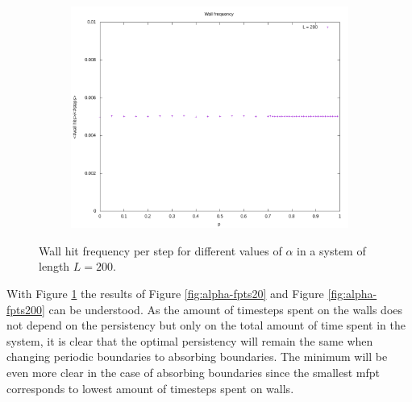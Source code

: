 \documentclass[]{scrartcl}
\begin{document}
\begin{figure}[!hbt]
\begin{subfigure}{0.45\textwidth}
\end{subfigure}
\begin{subfigure}{0.45\textwidth}
 \includegraphics[width=\textwidth]{./fig/alpha/wallFreq/WF-alpha=1-rel.png}
\end{subfigure}
\caption{Wall hit frequency per step for different values of $\alpha$ in a system of length $L = 200$.} 
\label{fig:alpha-wallFreq}
\end{figure}

With Figure \ref{fig:alpha-wallFreq} the results of Figure \ref{fig:alpha-fpts20} and Figure \ref{fig:alpha-fpts200} can be understood. As the amount of timesteps spent on the walls does not depend on the persistency but only on the total amount of time spent in the system, it is clear that the optimal persistency will remain the same when changing periodic boundaries to absorbing boundaries. The minimum will be even more clear in the case of absorbing boundaries since the smallest mfpt corresponds to lowest amount of timesteps spent on walls.

 
\end{document}
